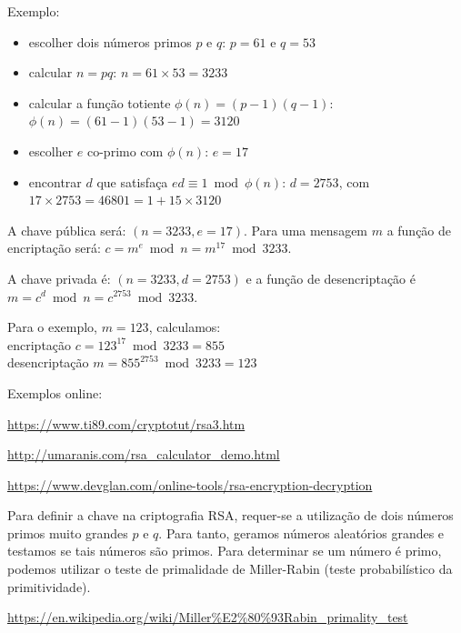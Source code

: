 \begin{frame}
Exemplo:
\begin{itemize}
\item escolher dois números primos $p$ e $q$: $p=61$ e $q=53$
\item calcular $n = pq$: $n = 61 \times 53 = 3233$
\item calcular a função totiente $\phi(n) = (p-1)(q-1)$: $\phi(n) = (61 - 1)(53 - 1) = 3120$
\item escolher $e$ co-primo com $\phi(n)$: $e = 17$
\item encontrar $d$ que satisfaça $e d \equiv 1 \bmod{\phi(n)}$: $d=2753$, com $17 \times 2753 = 46801 = 1 + 15 \times 3120$
\end{itemize}
A chave pública será: $(n=3233, e=17)$. Para uma mensagem $m$ a função de encriptação será: $c = m^e \bmod{n} = m^{17} \bmod 3233$.

A chave privada é: $(n=3233, d=2753)$ e a função de desencriptação é $m = c^d \bmod{n} = c^{2753} \bmod 3233$.

\vspace{2ex}
Para o exemplo, $m=123$, calculamos:\\
encriptação $c = 123^{17} \bmod 3233 = 855$\\
desencriptação $m = 855^{2753} \bmod 3233 = 123$

\framebreak

Exemplos online:

\url{https://www.ti89.com/cryptotut/rsa3.htm} 

\url{http://umaranis.com/rsa_calculator_demo.html} 

\url{https://www.devglan.com/online-tools/rsa-encryption-decryption}


\framebreak

Para definir a chave na criptografia RSA, requer-se a utilização de dois números primos muito grandes $p$ e $q$.
Para tanto, geramos números aleatórios grandes e testamos se tais números são primos. Para determinar se um número
é primo, podemos utilizar o teste de primalidade de Miller-Rabin (teste probabilístico da primitividade).

\url{https://en.wikipedia.org/wiki/Miller\%E2\%80\%93Rabin\_primality\_test}

\framebreak


\end{frame}
